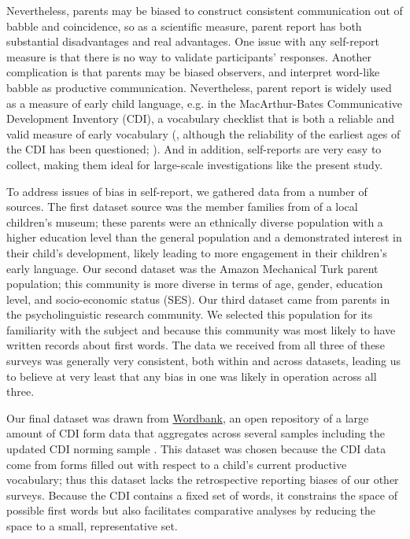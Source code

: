 \documentclass[10pt,letterpaper]{article}
\begin{document}
Nevertheless, parents may be biased to construct consistent communication out of babble and coincidence, so as a scientific measure, parent report has both substantial disadvantages and real advantages. One issue with any self-report measure is that there is no way to validate participants' responses. Another complication is that parents may be biased observers, and interpret word-like babble as productive communication. Nevertheless, parent report is widely used as a measure of early child language, e.g. in the MacArthur-Bates Communicative Development Inventory (CDI), a vocabulary checklist that is both a reliable and valid measure of early vocabulary (, although the reliability of the earliest ages of the CDI has been questioned; ). And in addition, self-reports are very easy to collect, making them ideal for large-scale investigations like the present study. 

To address issues of bias in self-report, we gathered data from a number of sources. The first dataset source was the member families from of a local children's museum; these parents were an ethnically diverse population with a higher education level than the general population and a demonstrated interest in their child's development, likely leading to more engagement in their children's early language. Our second dataset was the Amazon Mechanical Turk parent population; this community is more diverse in terms of age, gender, education level, and socio-economic status (SES). Our third dataset came from parents in the psycholinguistic research community. We selected this population for its familiarity with the subject and because this community was most likely to have written records about first words. The data we received from all three of these surveys was generally very consistent, both within and across datasets, leading us to believe at very least that any bias in one was likely in operation across all three. 

Our final dataset was drawn from \href{http://wordbank.stanford.edu}{Wordbank}, an open repository of a large amount of CDI form data that aggregates across several samples including the updated CDI norming sample \cite{fenson2007}. This dataset was chosen because the CDI data come from forms filled out with respect to a child's current productive vocabulary; thus this dataset lacks the retrospective reporting biases of our other surveys. Because the CDI contains a fixed set of words, it constrains the space of possible first words but also facilitates comparative analyses by reducing the space to a small, representative set.
\end{document}
